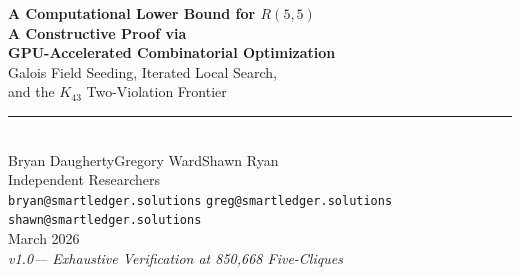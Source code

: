 \documentclass[11pt,a4paper]{article}
\theoremstyle{plain}
\theoremstyle{remark}
\begin{document}
\thispagestyle{empty}


\vspace*{0.5cm}

\begin{center}
  {\fontsize{22}{26}\selectfont\bfseries\color{accent}
   A Computational Lower Bound for $R(5,5)$}\\[6pt]
  {\fontsize{16}{20}\selectfont\bfseries\color{accent}
   A Constructive Proof via\\[2pt]
   GPU-Accelerated Combinatorial Optimization}\\[14pt]
  {\large\color{accentlight}
   Galois Field Seeding, Iterated Local Search,\\
   and the $K_{43}$ Two-Violation Frontier}\\[20pt]
  {\color{titlegold}\rule{6cm}{0.8pt}}\\[20pt]
  {\Large Bryan Daugherty\qquad Gregory Ward\qquad Shawn Ryan}\\[8pt]
  {\small\color{subtlegray}
    Independent Researchers\\[2pt]
    \texttt{bryan@smartledger.solutions}\quad
    \texttt{greg@smartledger.solutions}\quad
    \texttt{shawn@smartledger.solutions}}\\[16pt]
  {\normalsize\color{subtlegray} March 2026}\\[6pt]
  {\small\color{subtlegray}\itshape v1.0\enspace---\enspace
    Exhaustive Verification at 850{,}668 Five-Cliques}
\end{center}

\vspace{14pt}

\noindent
{}

\vspace{10pt}
\end{document}
